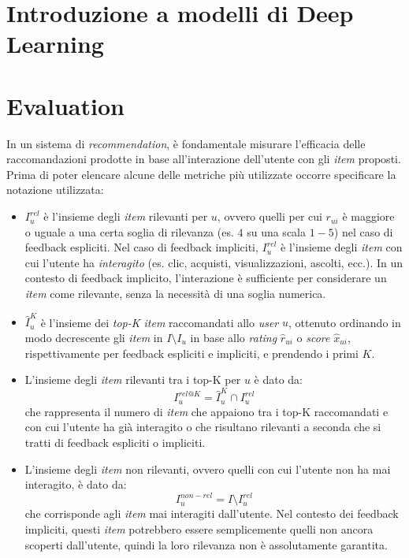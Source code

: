 \section{Introduzione a modelli di Deep Learning}\label{introduzione-a-modelli-di-deep-learning}

\section{Evaluation}

In un sistema di \textit{recommendation}, è fondamentale misurare l'efficacia delle raccomandazioni prodotte in base all'interazione dell'utente con gli \textit{item} proposti. Prima di poter elencare alcune delle metriche più utilizzate occorre specificare la notazione utilizzata:

\begin{itemize}
    \item $I_u^{rel}$ è l'insieme degli \textit{item} rilevanti per $u$, ovvero quelli per cui $r_{ui}$ è maggiore o uguale a una certa soglia di rilevanza (es. $4$ su una scala $1-5$) nel caso di feedback espliciti. Nel caso di feedback impliciti, $I_u^{rel}$ è l'insieme degli \textit{item} con cui l'utente ha \textit{interagito} (es. clic, acquisti, visualizzazioni, ascolti, ecc.). In un contesto di feedback implicito, l'interazione è sufficiente per considerare un \textit{item} come rilevante, senza la necessità di una soglia numerica.
    \item $\hat{I}_u^K$ è l'insieme dei \textit{top-K item} raccomandati allo \textit{user} $u$, ottenuto ordinando in modo decrescente gli \textit{item} in $I \setminus I_u$ in base allo \textit{rating} $\hat{r}_{ui}$ o \textit{score} $\hat{x}_{ui}$, rispettivamente per feedback espliciti e impliciti, e prendendo i primi $K$.
    \item L'insieme degli \textit{item} rilevanti tra i top-K per $u$ è dato da:
    \[
    I_u^{rel@K} = \hat{I}_u^K \cap I_u^{rel}
    \]
    che rappresenta il numero di \textit{item} che appaiono tra i top-K raccomandati e con cui l'utente ha già interagito o che risultano rilevanti a seconda che si tratti di feedback espliciti o impliciti.
    \item L'insieme degli \textit{item} non rilevanti, ovvero quelli con cui l'utente non ha mai interagito, è dato da:
    \[
    I_u^{non-rel} = I \setminus I_u^{rel}
    \]
    che corrisponde agli \textit{item} mai interagiti dall'utente. Nel contesto dei feedback impliciti, questi \textit{item} potrebbero essere semplicemente quelli non ancora scoperti dall'utente, quindi la loro rilevanza non è assolutamente garantita.
\end{itemize}




